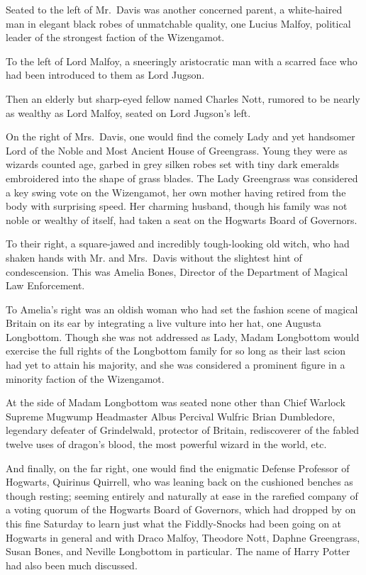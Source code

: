 Seated to the left of Mr.~Davis was another concerned parent, a white-haired man in elegant black robes of unmatchable quality, one Lucius Malfoy, political leader of the strongest faction of the Wizengamot.

To the left of Lord Malfoy, a sneeringly aristocratic man with a scarred face who had been introduced to them as Lord Jugson.

Then an elderly but sharp-eyed fellow named Charles Nott, rumored to be nearly as wealthy as Lord Malfoy, seated on Lord Jugson's left.

On the right of Mrs.~Davis, one would find the comely Lady and yet handsomer Lord of the Noble and Most Ancient House of Greengrass. Young they were as wizards counted age, garbed in grey silken robes set with tiny dark emeralds embroidered into the shape of grass blades. The Lady Greengrass was considered a key swing vote on the Wizengamot, her own mother having retired from the body with surprising speed. Her charming husband, though his family was not noble or wealthy of itself, had taken a seat on the Hogwarts Board of Governors.

To their right, a square-jawed and incredibly tough-looking old witch, who had shaken hands with Mr. and Mrs.~Davis without the slightest hint of condescension. This was Amelia Bones, Director of the Department of Magical Law Enforcement.

To Amelia's right was an oldish woman who had set the fashion scene of magical Britain on its ear by integrating a live vulture into her hat, one Augusta Longbottom. Though she was not addressed as Lady, Madam Longbottom would exercise the full rights of the Longbottom family for so long as their last scion had yet to attain his majority, and she was considered a prominent figure in a minority faction of the Wizengamot.

At the side of Madam Longbottom was seated none other than Chief Warlock Supreme Mugwump Headmaster Albus Percival Wulfric Brian Dumbledore, legendary defeater of Grindelwald, protector of Britain, rediscoverer of the fabled twelve uses of dragon's blood, the most powerful wizard in the world, etc.

And finally, on the far right, one would find the enigmatic Defense Professor of Hogwarts, Quirinus Quirrell, who was leaning back on the cushioned benches as though resting; seeming entirely and naturally at ease in the rarefied company of a voting quorum of the Hogwarts Board of Governors, which had dropped by on this fine Saturday to learn just what the Fiddly-Snocks had been going on at Hogwarts in general and with Draco Malfoy, Theodore Nott, Daphne Greengrass, Susan Bones, and Neville Longbottom in particular. The name of Harry Potter had also been much discussed.


